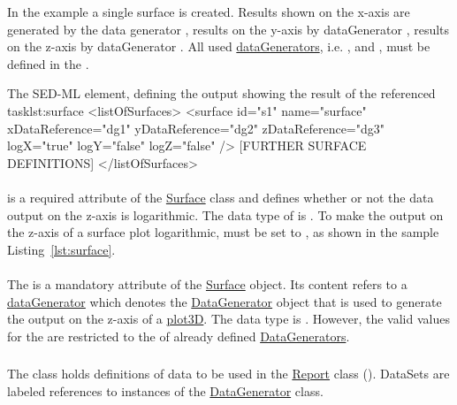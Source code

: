 In the example a single surface is created. Results shown on the x-axis are generated by the data generator , results on the y-axis by dataGenerator , results on the z-axis by dataGenerator . All used \hyperref[class:dataGenerator]{dataGenerators}, i.e. ,  and , must be defined in the \hyperref[sec:listOfDataGenerators]{}.
\begin{myXmlLst}{The SED-ML  element, defining the output showing the result of the referenced task}{lst:surface}
<listOfSurfaces>
	<surface id="s1" name="surface" xDataReference="dg1" yDataReference="dg2" zDataReference="dg3" 
		logX="true"  logY="false" logZ="false" />
	[FURTHER SURFACE DEFINITIONS]
</listOfSurfaces>
\end{myXmlLst}

\paragraph*{}
\label{sec:logZ}
 is a required attribute of the \hyperref[class:surface]{Surface} class and defines whether or not the data output on the z-axis is logarithmic. The data type of  is . To make the output on the z-axis of a surface plot logarithmic,  must be set to , as shown in the sample Listing~\ref{lst:surface}.

\paragraph*{}
\label{sec:zDataReference}
The  is a mandatory attribute of the \hyperref[class:surface]{Surface} object. Its content refers to a \hyperref[class:dataGenerator]{dataGenerator} which denotes the \hyperref[class:dataGenerator]{DataGenerator} object that is used to generate the output on the z-axis of a \hyperref[class:plot3D]{plot3D}. The  data type is \hyperref[type:sidref]{}. However, the valid values for the  are restricted to the \hyperref[sec:id]{} of already defined \hyperref[class:dataGenerator]{DataGenerators}.

\subsubsection{}
\label{class:dataSet}
The  class holds definitions of data to be used in the \hyperref[class:report]{Report} class (). DataSets are labeled references to instances of the \hyperref[class:dataGenerator]{DataGenerator} class.

